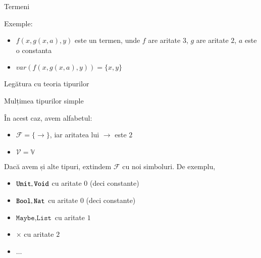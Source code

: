 \documentclass[xcolor=pdftex,romanian,colorlinks]{beamer}
\begin{document}
\begin{frame}{Termeni}

{\color{True} Exemple:}
\begin{itemize}
	\item $f(x,g(x,a),y)$ este un termen, unde $f$ are aritate $3$, $g$ are aritate $2$, $a$ este o constanta
	\item $var(f(x,g(x,a),y)) = \{x,y\}$
\end{itemize}
\end{frame}

\begin{frame}{Legătura cu teoria tipurilor}

Mulțimea  \alert{tipurilor simple}  \hspace{.2cm}
 
În acest caz, avem alfabetul:
\vspace{-.2cm}
\begin{itemize}
	\item $\mathcal{F} = \{\to\}$, iar aritatea lui $\to$ este $2$
	\item $\mathcal{V} = \mathbb{V}$
\end{itemize}

\vspace{.4cm}
Dacă avem și alte tipuri, extindem $\mathcal{F}$ cu noi simboluri. De exemplu,
\vspace{-.2cm}
\begin{itemize}
	\item $\texttt{Unit}, \texttt{Void}$ cu aritate $0$ (deci constante)
	\item $\texttt{Bool}, \texttt{Nat}$ cu aritate $0$ (deci constante)
	\item $\texttt{Maybe}, \texttt{List}$ cu aritate $1$
	\item $\times$ cu aritate $2$
	\item $\ldots$
\end{itemize}


\end{frame}
\end{document}
